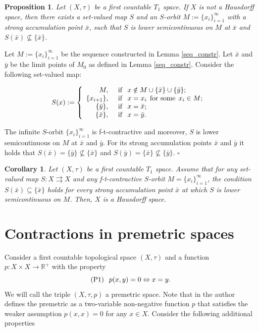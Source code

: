 \documentclass{article}
\def\text#1{\,\;\hbox{#1}\;\,}
\newcommand{\R}{\mathbb{R}}
\renewenvironment{proof}
         {\begin{trivlist}\item[
         {\bf Proof.}]}{{\hfill $\square$} \end{trivlist}}
\newtheorem{prop}[theo]{Proposition}
\newtheorem{cor}[theo]{Corollary}
\begin{document}
\begin{prop} %
Let $(X, \tau)$ be a first countable $T_1$ space. If $X$ is not a Hausdorff space, then there exists a set-valued map $S$ and an $S$-orbit $M:=\{x_i\}_{i=1}^{\infty}$ with a strong accumulation point $\bar{x}$, such that $S$ is lower semicontinuous on $M$ at $\bar{x}$ and $S(\bar{x}) \nsubseteq \{\bar{x}\}$.
\end{prop}
\begin{proof} Let $M:=\{x_i\}_{i = 1}^{\infty}$ be the sequence constructed in Lemma \ref{seq_constr}. Let $\bar{x}$ and $\bar{y}$ be the limit points of $M_0$ as defined in Lemma \ref{seq_constr}. Consider the following set-valued map:

\begin{equation}
S(x):= \left \{\begin{array}{rl} M, & \text{if } x \notin M \cup \{\bar{x}\} \cup \{\bar{y}\};  \\
\{x_{i+1}\}, & \text{if } x = x_{i} \text{for some} x_{i}  \in M; \\
\{\bar{y}\}, & \text{if } x=\bar{x};\\
\{\bar{x}\}, & \text{if } x=\bar{y}.\end{array}\right.
\end{equation}

The infinite $S$-orbit $\{x_i\}_{i = 1}^{\infty}$ is f-t-contractive and moreover, $S$ is lower semicontinuous on $M$ at $\bar{x}$ and $\bar{y}$. For its strong accumulation points $\bar{x}$ and $\bar{y}$ it holds that $S(\bar{x})=\{\bar{y}\} \nsubseteq \{\bar{x}\}$ and $S(\bar{y})=\{\bar{x}\}\nsubseteq \{\bar{y}\}$.
\end{proof}

\begin{cor}  Let $(X, \tau)$ be a first countable $T_1$ space. Assume that for any set-valued map $S: X \rightrightarrows X$ and any f-t-contractive $S$-orbit $M=\{x_i\}_{i=1}^{\infty}$, the condition $S(\bar{x}) \subseteq \{\bar{x}\}$ holds for every strong accumulation point $\bar{x}$ at which $S$ is lower semicontinuous on $M$. Then, $X$ is a Hausdorff space. \end{cor}

\section{Contractions in premetric spaces}


Consider a first countable topological space $(X,\tau)$ and a function $p:X\times X\to \R^+$ with the property \[\text{(P1)} \;  p(x,y)=0 \Leftrightarrow  x=y.\] We will call the triple $(X, \tau,p)$ a premetric space. Note that in \cite{Mas} the author defines the premetric as a two-variable non-negative function $p$ that satisfies the weaker assumption $p(x,x)=0$ for any $x \in X$. Consider the following additional properties
    
\end{document}
